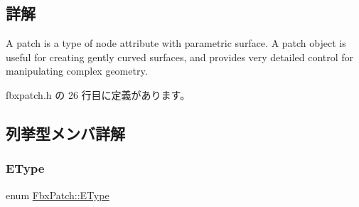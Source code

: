 \subsection{詳解}
A patch is a type of node attribute with parametric surface. A patch object is useful for creating gently curved surfaces, and provides very detailed control for manipulating complex geometry. 

 fbxpatch.\+h の 26 行目に定義があります。



\subsection{列挙型メンバ詳解}
\mbox{\label{class_fbx_patch_ad669936e6b844a7a15fa30ec7c183fbb}} 
\subsubsection{\texorpdfstring{E\+Type}{EType}}
{\footnotesize\ttfamily enum \hyperlink{class_fbx_patch_ad669936e6b844a7a15fa30ec7c183fbb}{Fbx\+Patch\+::\+E\+Type}}

